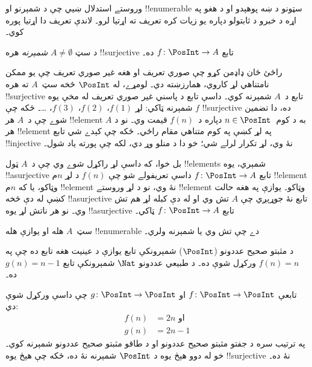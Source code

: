 \documentclass[../../../include/open-logic-section]{subfiles}
\begin{document}
وروستے استدلال ښيي چې د شمېرنو او !!{enumerable} سټونو د ښه
پوهېدو او د هغو په اړه د خبرو د ثابتولو دپاره يو زيات کره
تعريف ته اړتيا لرو۔ لاندې تعريف دا اړتيا پوره کوي۔

\begin{defn}
د سټ $A \neq \emptyset$ \emph{شمېرنه} هره !!{surjective}
تابع $f \colon \PosInt \to A$ ده۔
\end{defn}

\begin{explain}
راځئ ځان ډاډمن کړو چې صوري تعريف او هغه غير صوري تعريف چې
يو ممکن نامتناهي لړ کاروي، همارزښته دي۔ لومړے، له $\PosInt$
څخه سټ~$A$ ته هره !!{surjective} تابع د~$A$ شمېرنه کوي۔ داسې
تابع د پاسني غير صوري تعريف له مخې يوه شمېرنه ټاکي: لړ
$f(1)$، $f(2)$، $f(3)$، \dots۔ ځکه چې $f$ !!{surjective} ده،
دا تضمين شوے چې د~$A$ هر !!{element} به د کوم~$n \in \PosInt$
دپاره د~$f(n)$ قيمت وي۔ نو د $A$ هر !!{element} په لړ کښې
په کوم متناهي مقام راځي۔ ځکه چې کېدے شي تابع !!{injective}
نۀ وي، لړ تکرار لرلے شي؛ خو دا د منلو وړ دي، لکه چې پورته
ياد شول۔

بل خوا، که داسې لړ راکړل شوے وي چې د~$A$ ټول !!{element}s
شمېري، يوه !!a{surjective} تابع $f\colon \PosInt \to A$ داسې
تعريفولے شو چې $f(n)$ د لړ $n$م !!{element} وټاکو، يا که
$n$م !!{element} نۀ وي، نو د لړ وروستے !!{element} وټاکو۔
يوازې په هغه حالت کښې له دې څخه !!a{surjective} تابع نۀ
جوړېږي چې $A$ تش وي او له دې کبله لړ هم تش وي۔ نو هر ناتش
لړ يوه !!a{surjective} تابع $f\colon \PosInt \to A$ ټاکي۔
\end{explain}

\begin{defn}
  سټ~$A$ هله او يوازې هله !!{enumerable} دے چې تش وي يا شمېرنه ولري۔
\end{defn}

\begin{ex}
د مثبتو صحيح عددونو ($\PosInt$) شمېرونکې تابع يوازې د عينيت
هغه تابع ده چې په $f(n) = n$ ورکړل شوې ده۔ د طبيعي عددونو
$\Nat$ شمېرونکې تابع $g(n) = n - 1$ ده۔
\end{ex}

\begin{ex}
تابعې $f\colon \PosInt \to \PosInt$ او $g \colon \PosInt \to
\PosInt$ چې داسې ورکړل شوې دي:
\begin{align*}
f(n) & = 2n \text{ او}\\
g(n) & = 2n - 1
\end{align*}
په ترتيب سره د جفتو مثبتو صحيح عددونو او د طاقو مثبتو صحيح
عددونو شمېرنه کوي۔ خو له دوو هېڅ يوه د $\PosInt$ شمېرنه نۀ
ده، ځکه چې هېڅ يوه !!{surjective} نۀ ده۔
\end{ex}
\end{document}
